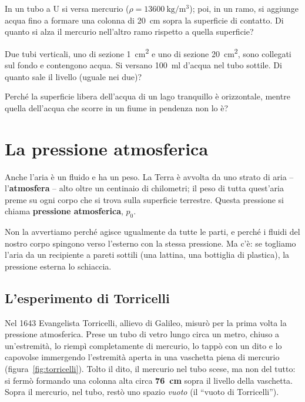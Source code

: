 \begin{esercizio}
In un tubo a U si versa mercurio ($\rho = \SI{13600}{\kilo\gram\per\metre\cubed}$); poi, in un ramo, si aggiunge acqua fino a formare una colonna di \SI{20}{\centi\metre} sopra la superficie di contatto. Di quanto si alza il mercurio nell'altro ramo rispetto a quella superficie?\\
\end{esercizio}

\begin{esercizio}
Due tubi verticali, uno di sezione \SI{1}{\centi\metre\squared} e uno di sezione \SI{20}{\centi\metre\squared}, sono collegati sul fondo e contengono acqua. Si versano \SI{100}{\milli\litre} d'acqua nel tubo sottile. Di quanto sale il livello (uguale nei due)?\\
\end{esercizio}

\begin{esercizio}
Perché la superficie libera dell'acqua di un lago tranquillo è orizzontale, mentre quella dell'acqua che scorre in un fiume in pendenza non lo è?\\
\end{esercizio}


\section{La pressione atmosferica}\label{sec:atm}

Anche l'aria è un fluido e ha un peso. La Terra è avvolta da uno strato di aria -- l'\textbf{atmosfera} -- alto oltre un centinaio di chilometri; il peso di tutta quest'aria preme su ogni corpo che si trova sulla superficie terrestre. Questa pressione si chiama \textbf{pressione atmosferica}, $p_0$.

Non la avvertiamo perché agisce ugualmente da tutte le parti, e perché i fluidi del nostro corpo spingono verso l'esterno con la stessa pressione. Ma c'è: se togliamo l'aria da un recipiente a pareti sottili (una lattina, una bottiglia di plastica), la pressione esterna lo schiaccia.

\subsection{L'esperimento di Torricelli}
Nel 1643 Evangelista Torricelli, allievo di Galileo, misurò per la prima volta la pressione atmosferica. Prese un tubo di vetro lungo circa un metro, chiuso a un'estremità, lo riempì completamente di mercurio, lo tappò con un dito e lo capovolse immergendo l'estremità aperta in una vaschetta piena di mercurio (figura~\ref{fig:torricelli}). Tolto il dito, il mercurio nel tubo scese, ma non del tutto: si fermò formando una colonna alta circa \textbf{\SI{76}{\centi\metre}} sopra il livello della vaschetta. Sopra il mercurio, nel tubo, restò uno spazio \emph{vuoto} (il ``vuoto di Torricelli'').

